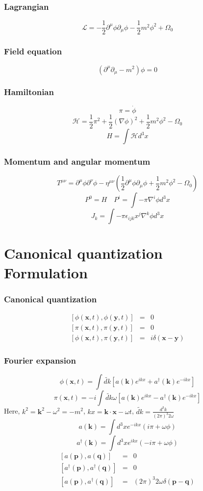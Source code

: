 \subsubsection{Lagrangian}
\[\mathcal{L} = -\frac{1}{2} \partial^{\mu} \phi \partial_{\mu} \phi -\frac{1}{2}m^2 \phi^2 + \Omega_0\]
\subsubsection{Field equation}
\[(\partial^{\mu} \partial_{\mu} - m^2) \phi = 0\]
\subsubsection{Hamiltonian}
\[\pi = \dot{\phi}\]
\[\mathcal{H} = \frac{1}{2} \pi^2 + \frac{1}{2} (\nabla \phi)^2 + \frac{1}{2} m^2 \phi^2-\Omega_0\]
\[H = \int \mathcal{H} d^3 x\]
\subsubsection{Momentum and angular momentum}
\[T^{\mu \nu} = \partial^{\mu} \phi \partial^{\nu} \phi - \eta^{\mu \nu}(\frac{1}{2}\partial^{\mu}\phi \partial_{\mu} \phi + \frac{1}{2}m^2 \phi^2 -\Omega_0)\]
\[P^0 = H \quad P^i = \int -\pi \nabla^i \phi d^3 x\]
\[J_k = \int - \pi \epsilon_{ijk} x^{j} \nabla^{k} \phi d^3 x\]

\section{Canonical quantization Formulation}
\subsubsection{Canonical quantization}
\begin{eqnarray}
\left[\phi(\bm{x},t),\phi(\bm{y},t)\right] &=& 0 \nonumber \\
\left[\pi(\bm{x},t),\pi(\bm{y},t)\right] &=& 0 \nonumber \\
\left[\phi(\bm{x},t),\pi(\bm{y},t)\right] &=& i \delta(\bm{x}-\bm{y}) \nonumber
\end{eqnarray}
\subsubsection{Fourier expansion}
\[\phi(\bm{x},t) = \int \widetilde{dk} \left[ a(\bm{k})e^{ikx} + a^{\dagger}(\bm{k})e^{-ikx} \right]\]
\[\pi(\bm{x},t) = -i \int  \widetilde{dk} \omega \left[ a(\bm{k})e^{ikx} - a^{\dagger}(\bm{k})e^{-ikx} \right]\]
Here, $k^2 = \bm{k}^2 - \omega^2 = -m^2$, $kx = \bm{k}\cdot \bm{x} - \omega t$, $\widetilde{dk} = \frac{d^3k}{(2\pi)^3 2\omega}$
\[a(\bm{k}) = \int d^3 x e^{-ikx}(i\pi+\omega \phi)\]
\[a^{\dagger}(\bm{k}) = \int d^3 x e^{ikx}(-i\pi+\omega \phi)\]
\begin{eqnarray}
\left[a(\bm{p}),a(\bm{q})\right] &=& 0 \nonumber \\
\left[a^{\dagger}(\bm{p}),a^{\dagger}(\bm{q})\right] &=& 0 \nonumber \\
\left[a(\bm{p}),a^{\dagger}(\bm{q})\right] &=& (2\pi)^3 2\omega \delta(\bm{p}-\bm{q}) \nonumber
\end{eqnarray}
